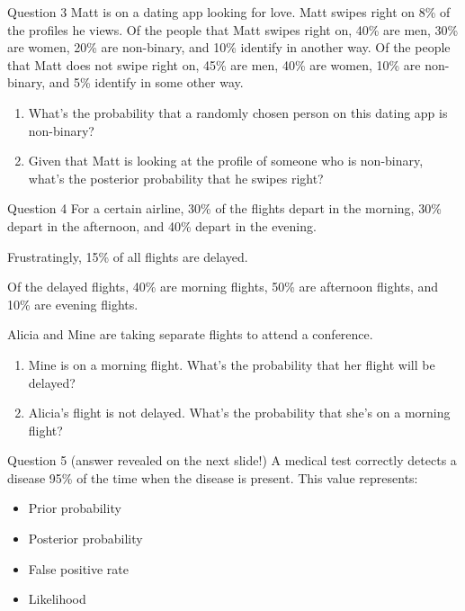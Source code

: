 \documentclass[12pt]{beamer}
\begin{document}
{%
\begin{frame}{}
\begin{block}{Question 3}
Matt is on a dating app looking for love. Matt swipes right on 8\% of the profiles he views.
Of the people that Matt swipes right on, 40\% are men, 30\% are women, 20\% are non-binary, and 10\% identify in another way.
Of the people that Matt does not swipe right on, 45\% are men, 40\% are women, 10\% are non-binary, and 5\% identify in some other way.
\begin{enumerate}
\item[a)] What’s the probability that a randomly chosen person on this dating app is non-binary?
\item[b)] Given that Matt is looking at the profile of someone who is non-binary, what’s the posterior probability that he swipes right?
\end{enumerate}
\end{block}
\end{frame}

\begin{frame}{}
\begin{block}{Question 4}
For a certain airline, 30\% of the flights depart in the morning, 30\% depart in the afternoon, and 40\% depart in the evening.

Frustratingly, 15\% of all flights are delayed.

Of the delayed flights, 40\% are morning flights, 50\% are afternoon flights, and 10\% are evening flights.

Alicia and Mine are taking separate flights to attend a conference.
\begin{enumerate}
\item[a)] Mine is on a morning flight. What’s the probability that her flight will be delayed?
\item[b)] Alicia’s flight is not delayed. What’s the probability that she’s on a morning flight?
\end{enumerate}
\end{block}
\end{frame}

\begin{frame}{}
\begin{block}{Question 5 \small \alert{(answer revealed on the next slide!)}}
A medical test correctly detects a disease 95\% of the time when the disease is present.
This value represents:
\begin{itemize}
\item[a.] Prior probability
\item[b.] Posterior probability
\item[c.] False positive rate
\item[d.] Likelihood
\end{itemize}
\end{block}
\end{frame}

}
\end{document}
